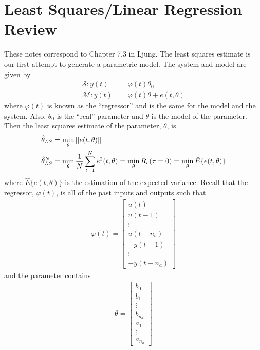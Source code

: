 \documentclass[lecture,12pt,]{pcms-l}
\begin{document}
\mainmatter
\setcounter{page}{1}

\lectureseries[\course]{\course}

\date{October 20, 2009}

\setaddress

\setcounter{lecture}{7}
\setcounter{chapter}{7}


\section{Least Squares/Linear Regression Review}
These notes correspond to Chapter 7.3 in Ljung. The least squares estimate is our first attempt to generate a parametric model. The system and model are given by
\begin{align*}
\mathcal{S}: y(t) &= \varphi(t)\theta_0 \\
\mathcal{M}: y(t) &= \varphi(t)\theta + e(t,\theta)
\end{align*}
where $\varphi(t)$ is known as the ``regressor'' and is the same for the model and the system. Also, $\theta_0$ is the ``real'' parameter and $\theta$ is the model of the parameter. Then the least squares estimate of the parameter, $\theta$, is
\begin{align*}
\hat{\theta}_{LS} &= \min_\theta ||e(t,\theta)|| \\
\hat{\theta}_{LS}^N &= \min_\theta \frac{1}{N}\sum_{t=1}^Ne^2(t,\theta) = \min_\theta R_e(\tau=0) = \min_\theta\hat{E}\{e(t,\theta)\}
\end{align*}
where $\hat{E}\{e(t,\theta)\}$ is the estimation of the expected variance. Recall that the regressor, $\varphi(t)$, is all of the past inputs and outputs such that
\begin{align}
\label{eq:regressor}
\varphi(t) = \left[\begin{array}{c} u(t) \\ u(t-1) \\ \vdots \\ u(t-n_b) \\ -y(t-1) \\ \vdots \\ -y(t-n_a) \end{array}\right]
\end{align}
and the parameter contains
\begin{align}
\label{eq:parameter}
\theta = \left[\begin{array}{c} b_0 \\ b_1 \\ \vdots \\ b_{n_b} \\ a_1 \\ \vdots \\ a_{n_a} \end{array}\right]
\end{align}
\end{document}
